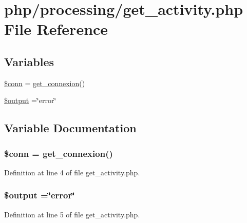 \hypertarget{get__activity_8php}{\section{php/processing/get\-\_\-activity.php File Reference}
\label{get__activity_8php}
}
\subsection*{Variables}
\begin{DoxyCompactItemize}
\item 
\hyperlink{get__activity_8php_aa8a5a87b9c1a6a0819b88447cbe41877}{\$conn} = \hyperlink{php__functions_8php_ace18bc10f3fd08f92688ac743e0d8c2e}{get\-\_\-connexion}()
\item 
\hyperlink{get__activity_8php_a73004ce9cd673c1bfafd1dc351134797}{\$output} =\char`\"{}error\char`\"{}
\end{DoxyCompactItemize}


\subsection{Variable Documentation}
\hypertarget{get__activity_8php_aa8a5a87b9c1a6a0819b88447cbe41877}{
\subsubsection[{\$conn}]{\setlength{\rightskip}{0pt plus 5cm}\$conn = {\bf get\-\_\-connexion}()}}\label{get__activity_8php_aa8a5a87b9c1a6a0819b88447cbe41877}


Definition at line 4 of file get\-\_\-activity.\-php.

\hypertarget{get__activity_8php_a73004ce9cd673c1bfafd1dc351134797}{
\subsubsection[{\$output}]{\setlength{\rightskip}{0pt plus 5cm}\$output =\char`\"{}error\char`\"{}}}\label{get__activity_8php_a73004ce9cd673c1bfafd1dc351134797}


Definition at line 5 of file get\-\_\-activity.\-php.

